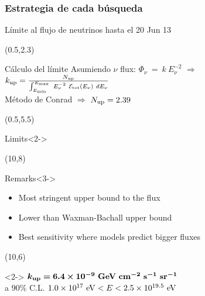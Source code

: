 \begin{frame}
 \frametitle{Estrategia de cada b\'usqueda}
 \begin{center}
 \end{center}
\end{frame}

\begin{frame}{L\'imite al flujo de neutrinos hasta el 20 Jun 13}
	\scriptsize
		\begin{textblock}{15}(0.5,2.3)
			\begin{alertblock}{C\'alculo del l\'imite}
				\centering
				Asumiendo $\nu$ flux: $\Phi_\nu ~ = ~ k ~ E_\nu^{-2}$ $\Rightarrow$ $k_{\rm up} = \frac{N_{\rm up}}{\int_{E_{\rm min}}^{E_{\rm max}}~E_{\nu}^{-2}~{\cal E}_{\rm tot}(E_\nu)~dE_\nu}$
				\\
				M\'etodo de Conrad $\Rightarrow$ $N_{\rm up} = 2.39$
			\end{alertblock}
		\end{textblock}	
		
		\begin{textblock}{9}(0.5,5.5)
			\begin{block}{Limits}<2->
			\begin{overprint}
				\centerline{}
			\end{overprint}
			\end{block}
		\end{textblock}
		
		\begin{textblock}{5.6}(10,8)
			\begin{exampleblock}{Remarks}<3->
				\begin{itemize}
				\item Most stringent upper bound to the flux
				\item Lower than Waxman-Bachall upper bound
				\item Best sensitivity where models predict bigger fluxes
				\end{itemize}
			\end{exampleblock}
		\end{textblock}
% 		
		\begin{textblock}{5.6}(10,6)
			\begin{alertblock}{}<2->
			\centering
			\tiny
			$\bm{ k_{\rm up}=6.4 \times 10^{-9}~{\rm GeV~cm^{-2}~s^{-1}~sr^{-1}}}$
			\\ a $90\%$ C.L. $1.0\times10^{17}~{\rm eV}<E<2.5\times10^{19.5}~{\rm eV}$
			\end{alertblock}
		\end{textblock}
\end{frame}

